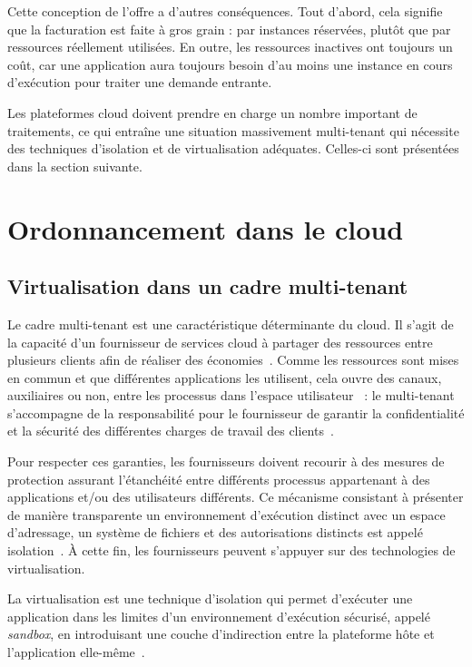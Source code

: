 Cette conception de l'offre a d'autres conséquences. Tout d'abord, cela signifie que la facturation est faite à gros grain : par instances réservées, plutôt que par ressources réellement utilisées. En outre, les ressources inactives ont toujours un coût, car une application aura toujours besoin d'au moins une instance en cours d'exécution pour traiter une demande entrante.

Les plateformes cloud doivent prendre en charge un nombre important de traitements, ce qui entraîne une situation massivement multi-tenant qui nécessite des techniques d'isolation et de virtualisation adéquates. Celles-ci sont présentées dans la section suivante.

\section{Ordonnancement dans le cloud}

\subsection{Virtualisation dans un cadre multi-tenant}

Le cadre multi-tenant est une caractéristique déterminante du cloud. Il s'agit de la capacité d'un fournisseur de services cloud à partager des ressources entre plusieurs clients afin de réaliser des économies~\cite{weissmanDesignForceCom2009}. Comme les ressources sont mises en commun et que différentes applications les utilisent, cela ouvre des canaux, auxiliaires ou non, entre les processus dans l'espace utilisateur~\cite{pedersen2017trash, wu2018side} : le multi-tenant s'accompagne de la responsabilité pour le fournisseur de garantir la confidentialité et la sécurité des différentes charges de travail des clients~\cite{vaqueroLockingSkySurvey2011}.

Pour respecter ces garanties, les fournisseurs doivent recourir à des mesures de protection assurant l'étanchéité entre différents processus appartenant à des applications et/ou des utilisateurs différents. Ce mécanisme consistant à présenter de manière transparente un environnement d'exécution distinct avec un espace d'adressage, un système de fichiers et des autorisations distincts est appelé isolation~\cite{fehlingCloudComputingPatterns2014}. À cette fin, les fournisseurs peuvent s'appuyer sur des technologies de virtualisation.

La virtualisation est une technique d'isolation qui permet d'exécuter une application dans les limites d'un environnement d'exécution sécurisé, appelé \textit{sandbox}, en introduisant une couche d'indirection entre la plateforme hôte et l'application elle-même~\cite{singhviAtollScalableLowLatency2021}.

